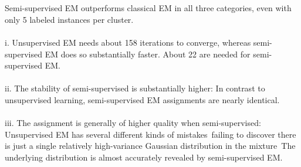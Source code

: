 \begin{answer}
\\ \\
Semi-supervised EM outperforms classical EM in all three categories, even with only 5 labeled instances per cluster. \\ \\
i. Unsupervised EM needs about 158 iterations to converge, whereas semi-supervised EM does so substantially faster. About 22 are needed for semi-supervised EM. \\ \\
ii. The stability of semi-supervised is substantially higher: In contrast to unsupervised learning, semi-supervised EM assignments are nearly identical. \\ \\
iii. The assignment is generally of higher quality when semi-supervised: Unsupervised EM has several different kinds of mistakes failing to discover there is just a single relatively high-variance Gaussian distribution in the mixture The underlying distribution is almost accurately revealed by semi-supervised EM. \\ \\
\end{answer}
